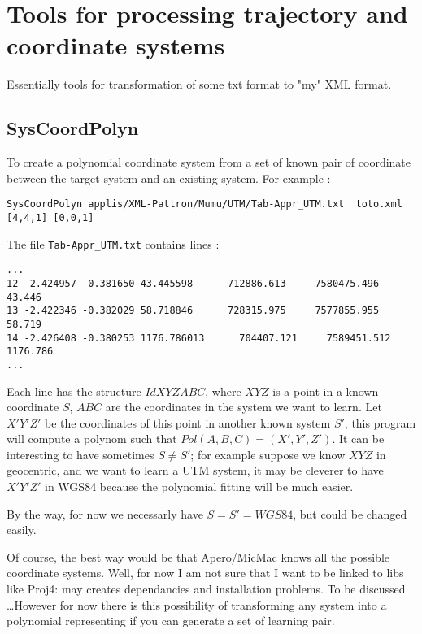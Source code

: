 
\section{Tools for processing trajectory and coordinate systems}

Essentially tools for transformation of some txt format to "my" XML format.

\subsection{SysCoordPolyn}


To create a polynomial coordinate system from a set of known pair of coordinate
between the target system and an existing system. For example :

\begin{verbatim}
SysCoordPolyn applis/XML-Pattron/Mumu/UTM/Tab-Appr_UTM.txt  toto.xml [4,4,1] [0,0,1]
\end{verbatim}

The file {\tt Tab-Appr\_UTM.txt} contains lines :


\begin{verbatim}
...
12 -2.424957 -0.381650 43.445598      712886.613     7580475.496         43.446
13 -2.422346 -0.382029 58.718846      728315.975     7577855.955         58.719
14 -2.426408 -0.380253 1176.786013      704407.121     7589451.512       1176.786
...
\end{verbatim}

Each line has the structure $Id X Y Z A B C$, where $X Y Z$ is a point
in a known coordinate  $S$,  $A B C$ are the coordinates in the system we want to
learn.  Let $X' Y' Z'$ be the coordinates of this point in another known system $S'$, this program will
compute a polynom such that $Pol(A,B,C)=(X',Y',Z')$. It can be interesting to have
sometimes $S \neq S'$; for example suppose we know $X Y Z$ in geocentric,
and we want to learn a UTM system, it may be cleverer to have $X' Y' Z'$ in WGS84
because the polynomial fitting will be much easier.

By the way, for now we necessarly have $S=S'=WGS84$, but could be changed easily.


Of course, the best way would be that Apero/MicMac knows all the possible coordinate systems.
Well, for now I am not sure that I want to be linked to libs like Proj4: may
creates dependancies and installation problems. To be discussed \dots However
for now there is this possibility of transforming any system into a polynomial
representing if you can generate a set of learning pair.


